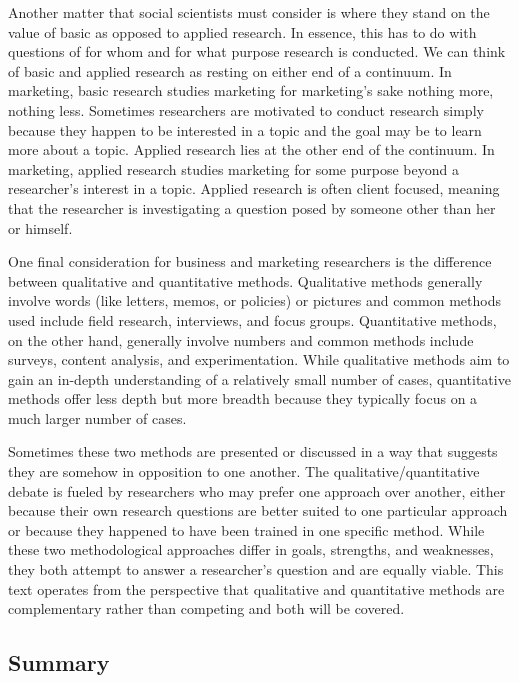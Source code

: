 Another matter that social scientists must consider is where they stand on the value of basic as opposed to applied research. In essence, this has to do with questions of for whom and for what purpose research is conducted. We can think of basic and applied research as resting on either end of a continuum. In marketing, basic research studies marketing for marketing's sake \textemdash \; nothing more, nothing less. Sometimes researchers are motivated to conduct research simply because they happen to be interested in a topic and the goal may be to learn more about a topic. Applied research lies at the other end of the continuum. In marketing, applied research studies marketing for some purpose beyond a researcher's interest in a topic. Applied research is often client focused, meaning that the researcher is investigating a question posed by someone other than her or himself.

One final consideration for business and marketing researchers is the difference between qualitative and quantitative methods. Qualitative methods generally involve words (like letters, memos, or policies) or pictures and common methods used include field research, interviews, and focus groups. Quantitative methods, on the other hand, generally involve numbers and common methods include surveys, content analysis, and experimentation. While qualitative methods aim to gain an in-depth understanding of a relatively small number of cases, quantitative methods offer less depth but more breadth because they typically focus on a much larger number of cases.

Sometimes these two methods are presented or discussed in a way that suggests they are somehow in opposition to one another. The qualitative/quantitative debate is fueled by researchers who may prefer one approach over another, either because their own research questions are better suited to one particular approach or because they happened to have been trained in one specific method. While these two methodological approaches differ in goals, strengths, and weaknesses, they both attempt to answer a researcher's question and are equally viable. This text operates from the perspective that qualitative and quantitative methods are complementary rather than competing and both will be covered. 

\subsection{Summary}

